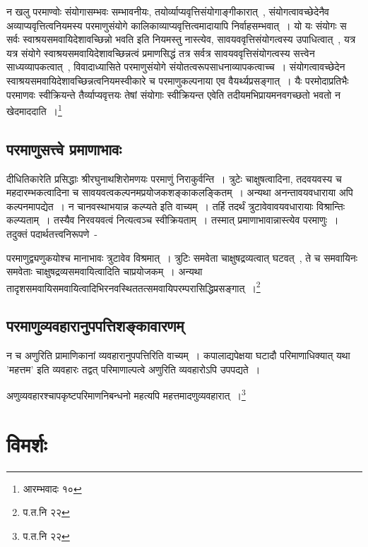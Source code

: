 		{\fontsize{11.7}{0}\selectfont\s न खलु परमाण्वोः संयोगासम्भवः सम्भावनीयः, तयोर्व्याप्यवृत्तिसंयोगाङ्गीकारात्~, संयोगत्वावच्छेदेनैव अव्याप्यवृत्तित्वनियमस्य परमाणुसंयोगे कालिकाव्याप्यवृत्तित्वमादायापि निर्वाहसम्भवात्~। यो यः संयोगः स सर्वः स्वाश्रयसमवायिदेशावच्छिन्नो भवति इति नियमस्तु नास्त्येव, सावयववृत्तिसंयोगत्वस्य उपाधित्वात्~, यत्र यत्र संयोगे स्वाश्रयसमवायिदेशावच्छिन्नत्वं प्रमाणसिद्धं तत्र सर्वत्र सावयववृत्तिसंयोगत्वस्य सत्त्वेन साध्यव्यापकत्वात्~, विवादाध्यासिते परमाणुसंयोगे संयोतत्वरूपसाधनाव्यापकत्वाच्च~। संयोगत्वावच्छेदेन स्वाश्रयसमवायिदेशावच्छिन्नत्वनियमस्वीकारे च परमाणुकल्पनाया एव वैयर्थ्यप्रसङ्गात्~। यैः परमोदाप्रतिभैः परमाणवः स्वीक्रियन्ते तैर्व्याप्यवृत्तयः तेषां संयोगाः स्वीक्रियन्त एवेति तदीयमभिप्रायमनवगच्छतो भवतो न खेदमाददाति~।\footnote{आरम्भवादः १०}}


		\subsection{परमाणुसत्त्वे प्रमाणाभावः}

		दीधितिकारेति प्रसिद्धाः श्रीरघुनाथशिरोमणयः परमाणुं निराकुर्वन्ति~। त्रुटेः चाक्षुषत्वादिना, तदवयवस्य च महदारम्भकत्वादिना च सावयवत्वकल्पनमप्रयोजकशङ्काकलङ्कितम्~। अन्यथा अनन्तावयवधाराया अपि कल्पनमापद्येत~। न चानवस्थाभयान्न कल्प्यते इति वाच्यम्~। तर्हि तदर्थं त्रुटावेवावयवधारायाः विश्रान्तिः कल्प्यताम्~। तस्यैव निरवयवत्वं नित्यत्वञ्च स्वीक्रियताम्~। तस्मात् प्रमाणाभावान्नास्त्येव परमाणुः~। तदुक्तं पदार्थतत्त्वनिरूपणे~- 

		{\fontsize{11.7}{0}\selectfont\s परमाणुद्व्यणुकयोश्च मानाभावः त्रुटावेव विश्रमात्~। त्रुटिः समवेता चाक्षुषद्रव्यत्वात् घटवत्~, ते च समवायिनः समवेताः चाक्षुषद्रव्यसमवायित्वादिति चाप्रयोजकम्~। अन्यथा तादृशसमवायिसमवायित्वादिभिरनवस्थिततत्समवायिपरम्परासिद्धिप्रसङ्गात्~।\footnote{प.त.नि २२}}

		\subsection{परमाणुव्यवहारानुपपत्तिशङ्कावारणम्}

		न च अणुरिति प्रामाणिकानां व्यवहारानुपपत्तिरिति वाच्यम्~। कपालाद्यपेक्षया घटादौ परिमाणाधिक्यात् यथा 'महत्तम' इति व्यवहारः तद्वत् परिमाणाल्पत्वे अणुरिति व्यवहारोऽपि उपपद्यते~।

		{\fontsize{11.7}{0}\selectfont\s अणुव्यवहारश्चापकृष्टपरिमाणनिबन्धनो महत्यपि महत्तमादणुव्यवहारात्~।\footnote{प.त.नि २२}}


	\section{विमर्शः}

